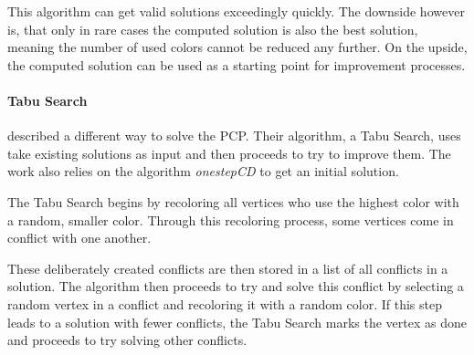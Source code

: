 \documentclass[paper=a4,fontsize=12pt]{scrartcl}
\begin{document}
This algorithm can get valid solutions exceedingly quickly. The downside however is, that only in rare cases the computed solution is also the best solution, meaning the number of used colors cannot be reduced any further. On the upside, the computed solution can be used as a starting point for improvement processes.

 
\paragraph{Tabu Search}{
\citet*{Noronha2006} described a different way to solve the PCP. Their algorithm, a Tabu Search, uses take existing solutions as input and then proceeds to try to improve them. The work also relies on the algorithm \emph{onestepCD} to get an initial solution.


The Tabu Search begins by recoloring all vertices who use the highest color with a random, smaller color. Through this recoloring process, some vertices come in conflict with one another. 


These deliberately created conflicts are then stored in a list of all conflicts in a solution. The algorithm then proceeds to try and solve this conflict by selecting a random vertex in a conflict and recoloring it with a random color. If this step leads to a solution with fewer conflicts, the Tabu Search marks the vertex as done and proceeds to try solving other conflicts.


}
\end{document}
